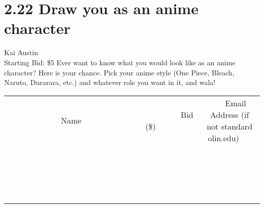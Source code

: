 \documentclass[11pt]{article}
\begin{document}
\section*{2.22 Draw you as an anime character}
Kai Austin
\\
Starting Bid: \$5
\newline
Ever want to know what you would look like as an anime character? Here is your chance. Pick your anime style (One Piece, Bleach, Naruto, Durarara, etc.) and whatever role you want in it, and wala!
\\[3ex]
\begin{tabular}{c c c}
~~~~~~~~~~~~~Name~~~~~~~~~~~~~ & ~~~~~~~~~Bid (\$)~~~~~~~~~  & ~~~Email Address (if not standard olin.edu)~~~\\
 & & \\
\hline
 & & \\
\hline
 & & \\
\hline
 & & \\
\hline
 & & \\
\hline
 & & \\
\hline
 & & \\
\hline
 & & \\
\hline
 & & \\
\hline
 & & \\
\hline
 & & \\
\hline
 & & \\
\hline
 & & \\
\hline
 & & \\
\hline
 & & \\
\hline
 & & \\
\hline
 & & \\
\hline
 & & \\
\hline
 & & \\
\hline
\end{tabular}
\newpage
\end{document}
